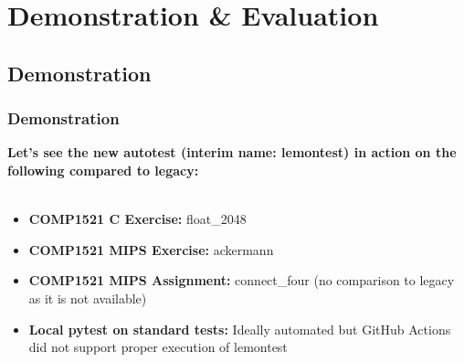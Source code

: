 \documentclass[xcolor, handout]{beamer}
\begin{document}
\section{Demonstration \& Evaluation}
\subsection{Demonstration}
\begin{frame}
	\frametitle{Demonstration}
	\textbf{Let's see the new autotest (interim name: lemontest) in action on the following compared to legacy:}
	\\~\\
	\begin{itemize}
		\setlength\itemsep{1em}
		\item \textbf{COMP1521 C Exercise:} float\_2048
		\item \textbf{COMP1521 MIPS Exercise:} ackermann
		\item \textbf{COMP1521 MIPS Assignment:} connect\_four (no comparison to legacy as it is not available)
		\item \textbf{Local pytest on standard tests:} Ideally automated but GitHub Actions did not support proper execution of lemontest
	\end{itemize}
\end{frame}
\end{document}
